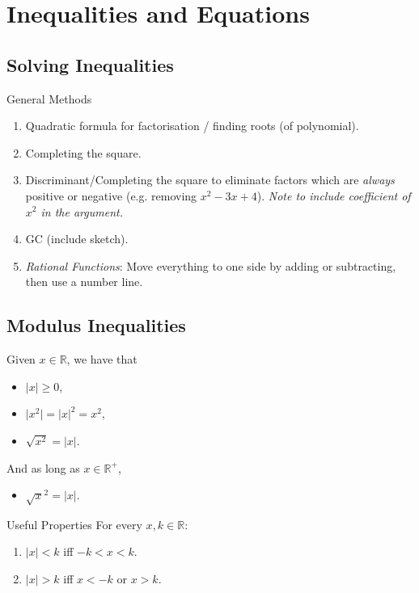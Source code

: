 \documentclass[oneside]{book}
\begin{document}


\chapter{Inequalities and Equations}
\section{Solving Inequalities}
\begin{stbox}{General Methods}
  \begin{enumerate}
    \item Quadratic formula for factorisation / finding roots (of polynomial).
    \item Completing the square.
    \item Discriminant/Completing the square to eliminate factors which are \emph{always} positive or negative (e.g. removing \(x^2-3x+4\)). \emph{Note to include coefficient of \(x^2\) in the argument.}
    \item GC (include sketch).
    \item \emph{Rational Functions}: Move everything to one side by adding or subtracting, then use a number line.
\end{enumerate}
\end{stbox}
\section{Modulus Inequalities}
\begin{fact}
    Given \(x \in \mathbb{R}\), we have that 
    \begin{itemize}
        \item \(\lvert x \rvert \geq 0\),
        \item \(\lvert x^2 \rvert=\lvert x \rvert^2=x^2\),
        \item \(\sqrt{x^2}=\lvert x \rvert\).
    \end{itemize}
    And as long as \(x \in \mathbb{R}^+\),
    \begin{itemize}
        \item \(\sqrt{x}^2=\lvert x \rvert\).
    \end{itemize}
\end{fact}
\begin{stbox}{Useful Properties}
  For every \(x,k \in \mathbb{R}\):
  \begin{enumerate}[label=(\alph*)]
      \item \(\lvert x \rvert < k\) iff \(-k<x<k\).
      \item \(\lvert x \rvert > k\) iff \(x<-k\) or \(x>k\).
  \end{enumerate}
\end{stbox}
\end{document}
